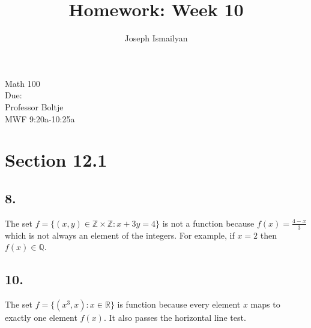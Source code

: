 \documentclass[12pt]{article}
\newcommand{\dueDate}{\formatdate{8}{12}{2017}} %
\newcommand{\hwNum}{10}
\begin{document}
	
\title{Homework: Week \hwNum}
\author{Joseph Ismailyan}
\date{}
\maketitle
\begin{flushleft}
Math 100 \\
Due: \dueDate \\ 
Professor Boltje \\
MWF 9:20a-10:25a
\end{flushleft}


\begin{minipage}[t]{0.40\textwidth}



\section*{Section 12.1}
\subsection*{8.}
The set $ f=\{(x,y)\in\mathbb{Z}\times\mathbb{Z}:x+3y=4\} $ is not a function because $f(x)=\frac{4-x}{3}$ which is not always an element of the integers. For example, if $ x = 2 $ then $ f(x)\in\mathbb{Q} $. 

\subsection*{10.}
The set $ f=\{(x^3,x):x\in\mathbb{R}\} $ is function because every element $ x $ maps to exactly one element $ f(x) $. It also passes the horizontal line test.

\end{minipage}
\hfill\vline\hfill
\end{document}
